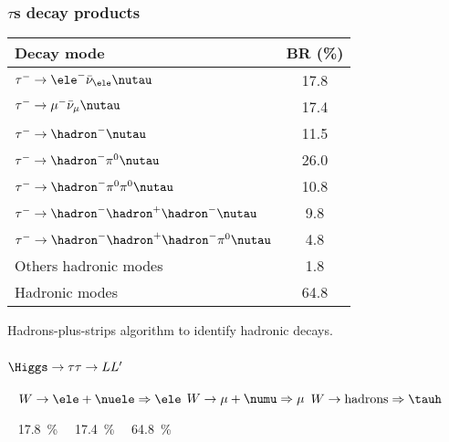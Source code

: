\begin{frame}
\frametitle{$\tau$s decay products}
\begin{center}
\begin{tabular}{lc}
\toprule
Decay mode & BR (\%)\\
\midrule
$\tau^-\to \ele^-\bar{\nu}_\ele\nutau$ & \num{17.8} \\
$\tau^-\to \mu^-\bar{\nu}_\mu\nutau$ & \num{17.4} \\
\midrule
$\tau^-\to \hadron^- \nutau$ & \num{11.5} \\
$\tau^-\to \hadron^- \pi^0 \nutau$ & \num{26.0} \\
$\tau^-\to \hadron^- \pi^0\pi^0 \nutau$ & \num{10.8} \\
$\tau^-\to \hadron^- \hadron^+\hadron^- \nutau$ & \num{9.8} \\
$\tau^-\to \hadron^- \hadron^+\hadron^-\pi^0\nutau$ & \num{4.8} \\
Others hadronic modes & \num{1.8} \\
Hadronic modes & \num{64.8} \\
\bottomrule
\end{tabular}
\bigskip
\manip Hadrons-plus-strips algorithm to identify hadronic decays.
\end{center}
\end{frame}

\begin{frame}
\frametitle{$\Higgs\to\tau\tau\to LL'$}
\begin{center}


\vspace{.2\textheight}

~\hfill
$W\to\ele+\nuele\Rightarrow\ele$%
\hfill
$W\to\mu+\numu\Rightarrow\mu$%
\hfill
$W\to \text{hadrons}\Rightarrow\tauh$%
\hfill
~

~\hfill
\SI{17.8}{\%}~~
\hfill
\SI{17.4}{\%}
\hfill
~~\SI{64.8}{\%}
\hfill
~
\end{center}
\end{frame}

